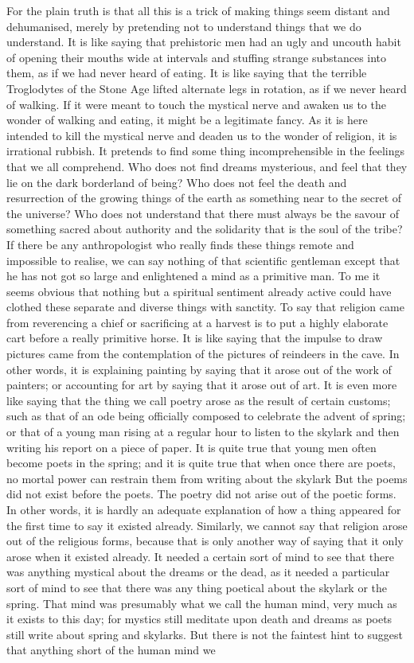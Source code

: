 For the plain truth is that all this is a trick of making things seem distant and dehumanised, merely by pretending not to understand things that we do understand. It is like saying that prehistoric men had an ugly and uncouth habit of opening their mouths wide at intervals and stuffing strange substances into them, as if we had never heard of eating. It is like saying that the terrible Troglodytes of the Stone Age lifted alternate legs in rotation, as if we never heard of walking. If it were meant to touch the mystical nerve and awaken us to the wonder of walking and eating, it might be a legitimate fancy. As it is here intended to kill the mystical nerve and deaden us to the wonder of religion, it is irrational rubbish. It pretends to find some thing incomprehensible in the feelings that we all comprehend. Who does not find dreams mysterious, and feel that they lie on the dark borderland of being? Who does not feel the death and resurrection of the growing things of the earth as something near to the secret of the universe? Who does not understand that there must always be the savour of something sacred about authority and the solidarity that is the soul of the tribe? If there be any anthropologist who really finds these things remote and impossible to realise, we can say nothing of that scientific gentleman except that he has not got so large and enlightened a mind as a primitive man. To me it seems obvious that nothing but a spiritual sentiment already active could have clothed these separate and diverse things with sanctity. To say that religion came from reverencing a chief or sacrificing at a harvest is to put a highly elaborate cart before a really primitive horse. It is like saying that the impulse to draw pictures came from the contemplation of the pictures of reindeers in the cave. In other words, it is explaining painting by saying that it arose out of the work of painters; or accounting for art by saying that it arose out of art. It is even more like saying that the thing we call poetry arose as the result of certain customs; such as that of an ode being officially composed to celebrate the advent of spring; or that of a young man rising at a regular hour to listen to the skylark and then writing his report on a piece of paper. It is quite true that young men often become poets in the spring; and it is quite true that when once there are poets, no mortal power can restrain them from writing about the skylark But the poems did not exist before the poets. The poetry did not arise out of the poetic forms. In other words, it is hardly an adequate explanation of how a thing appeared for the first time to say it existed already. Similarly, we cannot say that religion arose out of the religious forms, because that is only another way of saying that it only arose when it existed already. It needed a certain sort of mind to see that there was anything mystical about the dreams or the dead, as it needed a particular sort of mind to see that there was any thing poetical about the skylark or the spring. That mind was presumably what we call the human mind, very much as it exists to this day; for mystics still meditate upon death and dreams as poets still write about spring and skylarks. But there is not the faintest hint to suggest that anything short of the human mind we 